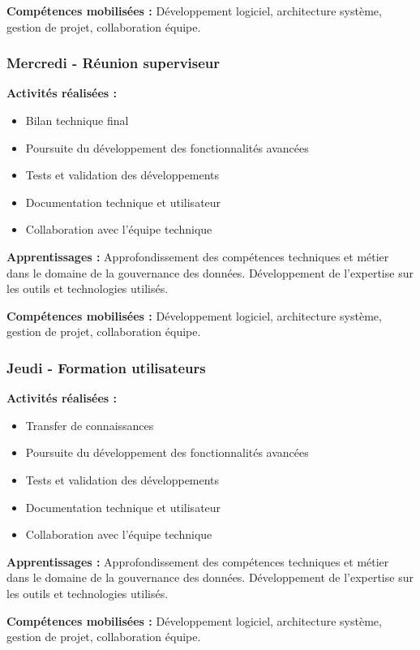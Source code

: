 \textbf{Compétences mobilisées :}
Développement logiciel, architecture système, gestion de projet, collaboration équipe.

\subsubsection{Mercredi - Réunion superviseur}

\textbf{Activités réalisées :}
\begin{itemize}
    \item Bilan technique final
    \item Poursuite du développement des fonctionnalités avancées
    \item Tests et validation des développements
    \item Documentation technique et utilisateur
    \item Collaboration avec l'équipe technique
\end{itemize}

\textbf{Apprentissages :}
Approfondissement des compétences techniques et métier dans le domaine de la gouvernance des données. Développement de l'expertise sur les outils et technologies utilisés.

\textbf{Compétences mobilisées :}
Développement logiciel, architecture système, gestion de projet, collaboration équipe.

\subsubsection{Jeudi - Formation utilisateurs}

\textbf{Activités réalisées :}
\begin{itemize}
    \item Transfer de connaissances
    \item Poursuite du développement des fonctionnalités avancées
    \item Tests et validation des développements
    \item Documentation technique et utilisateur
    \item Collaboration avec l'équipe technique
\end{itemize}

\textbf{Apprentissages :}
Approfondissement des compétences techniques et métier dans le domaine de la gouvernance des données. Développement de l'expertise sur les outils et technologies utilisés.

\textbf{Compétences mobilisées :}
Développement logiciel, architecture système, gestion de projet, collaboration équipe.

